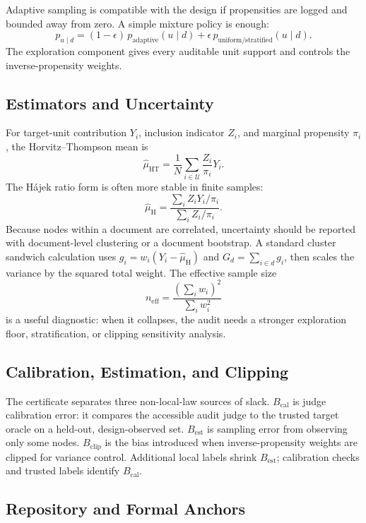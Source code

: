 Adaptive sampling is compatible with the design if propensities are logged
and bounded away from zero. A simple mixture policy is enough:
\[
  p_{u\mid d}
  =
  (1-\epsilon)\,p_{\mathrm{adaptive}}(u\mid d)
  +
  \epsilon\,p_{\mathrm{uniform/stratified}}(u\mid d).
\]
The exploration component gives every auditable unit support and controls
the inverse-propensity weights.

\subsection{Estimators and Uncertainty}

For target-unit contribution $Y_i$, inclusion indicator $Z_i$, and marginal
propensity $\pi_i$, the Horvitz--Thompson mean is
\[
  \hat\mu_{\mathrm{HT}}
  =
  \frac{1}{N}\sum_{i\in\mathcal U}\frac{Z_i}{\pi_i}Y_i.
\]
The H\'ajek ratio form is often more stable in finite samples:
\[
  \hat\mu_{\mathrm{H}}
  =
  \frac{\sum_i Z_iY_i/\pi_i}{\sum_i Z_i/\pi_i}.
\]
Because nodes within a document are correlated, uncertainty should be
reported with document-level clustering or a document bootstrap. A standard
cluster sandwich calculation uses
$g_i=w_i(Y_i-\hat\mu_{\mathrm H})$ and
$G_d=\sum_{i\in d}g_i$, then scales the variance by the squared total weight.
The effective sample size
\[
  n_{\mathrm{eff}} = \frac{(\sum_i w_i)^2}{\sum_i w_i^2}
\]
is a useful diagnostic: when it collapses, the audit needs a stronger
exploration floor, stratification, or clipping sensitivity analysis.

\subsection{Calibration, Estimation, and Clipping}

The certificate separates three non-local-law sources of slack.
$B_{\mathrm{cal}}$ is judge calibration error: it compares the accessible
audit judge to the trusted target oracle on a held-out, design-observed set.
$B_{\mathrm{est}}$ is sampling error from observing only some nodes.
$B_{\mathrm{clip}}$ is the bias introduced when inverse-propensity weights are
clipped for variance control. Additional local labels shrink
$B_{\mathrm{est}}$; calibration checks and trusted labels identify
$B_{\mathrm{cal}}$.

\subsection{Repository and Formal Anchors}

